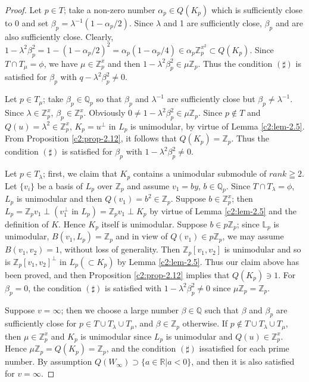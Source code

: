 \begin{proof}
Let $p\in T$; take a non-zero number $\alpha_p\in
Q(K_p)$ which is sufficiently close to $0$ and set $\beta_p
=\lambda^{-1} (1-\alpha_p / 2)$. Since $\lambda$ and 1 are sufficiently
close, $\beta_p$ and are also sufficiently
close. Clearly, $1-\lambda^2 \beta^2_p  =
1-(1-\alpha_p / 2)^2=\alpha_p(1-\alpha_p/4)\in \alpha_p \mathbb{Z}^{x^2}_p
\subset Q(K_p)$. Since $T \cap T_{\mu}=\phi$, we have
$\mu\in \mathbb{Z}^x_p$ and then
$1-\lambda^2\beta^2_p\in \mu \mathbb{Z}_p$. Thus the condition
$(\sharp)$ is satisfied for $\beta_p$ with $q-\lambda^2\beta^2_p \neq
0$. 

Let $p\in T_{\mu}$; take $\beta_p \in \mathbb{Q}_p$ so
that $\beta_p$ and $\lambda^{-1}$ are sufficiently close but
$\beta_p\neq \lambda^{-1}$. Since
$\lambda \in \mathbb{Z}^x_p$,
$\beta_p\in \mathbb{Z}^x_p$. Obviously $0\neq
1-\lambda^2 \beta^2_p \in \mu\mathbb{Z}_p$. Since $p\not\in T$
and $Q(u)=\lambda^2 \in \mathbb{Z}^x_p$, $K_p=u^{\perp}$ in
$L_p$ is unimodular, by virtue of Lemma \ref{c2:lem-2.5}. From
Proposition \ref{c2:prop-2.12}, it 
follows that $Q(K_p)=\mathbb{Z}_p$. Thus the condition $(\sharp)$ is
satisfied for $\beta_p$ with $1-\lambda^2 \beta^2_p\neq 0$.


Let $p\in T_{\lambda}$; first, we claim that $K_p$ contains a
unimodular submodule of $rank \geqq 2$. Let $\{v_i\}$ be a basis of
$L_p$ over $\mathbb{Z}_p$ and assume $v_1 = by$,
$b\in \mathbb{Q}_p$. Since $T\cap T_{\lambda} = \phi$, $L_p$
is unimodular and then $Q(v_1)=b^2\in \mathbb{Z}_p$. Suppose
$b\in \mathbb{Z}^x_p$; then $L_p =\mathbb{Z}_p
v_1 \perp(v^{\perp}_1 \text{ in } L_p) = \mathbb{Z}_pv_1 \perp K_p$ by
virtue of Lemma \ref{c2:lem-2.5} and the definition of $K$. Hence $K_p$ itself is
unimodular. Suppose $b\in p \mathbb{Z}_p$; since
$\mathbb{L}_p$ is unimodular, $B(v_1, L_p)=\mathbb{Z}_p$ and in view
of $Q(v_1) \in p\mathbb{Z}_p$, we may assume $B(v_1, v_2)=1$,
without loss of generality. Then $\mathbb{Z}_p[v_1,v_2]$ is unimodular
and so is $\mathbb{Z}_p[v_1, v_2]^{\perp}$ in $L_p(\subset K_p)$ by
Lemma \ref{c2:lem-2.5}. Thus our claim above has been proved, and then Proposition
\ref{c2:prop-2.12} implies that $Q(K_p) \ni 1$. For $\beta_p=0$, the condition
$(\sharp)$ is satisfied with $1-\lambda^2 \beta^2_p\neq 0$ since
$\mu\mathbb{Z}_p =\mathbb{Z}_p$.

Suppose $v=\infty$; then we choose a large number
$\beta\in \mathbb{Q}$ such that $\beta$ and $\beta_p$ are
sufficiently close for $p\in T \cup T_{\lambda} \cup T_{\mu}$,
and $\beta \in \mathbb{Z}_p$ otherwise. If $p\not\in T \cup
T_{\lambda} \cup T_{\mu}$, then $\mu \in \mathbb{Z}^x_p$ and
$K_p$ is unimodular since $L_p$ is unimodular and
$Q(u)\in \mathbb{Z}^x_p$. Hence $\mu\mathbb{Z}_p =Q(K_p)
=\mathbb{Z}_p$, and the condition $(\sharp)$
is\pageoriginale satisfied for each prime number. By assumption
$Q(W_{\infty})\supset \{a\in\mathbb{R}|a<0\}$, and then it is also
satisfied for $v=\infty$.


\end{proof}

